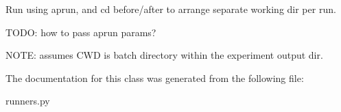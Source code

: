 \begin{DoxyVerb}Run using aprun, and cd before/after to arrange separate working
dir per run.

TODO: how to pass aprun params?

NOTE: assumes CWD is batch directory within the experiment output dir.
\end{DoxyVerb}
 

The documentation for this class was generated from the following file\+:\begin{DoxyCompactItemize}
\item 
runners.\+py\end{DoxyCompactItemize}

